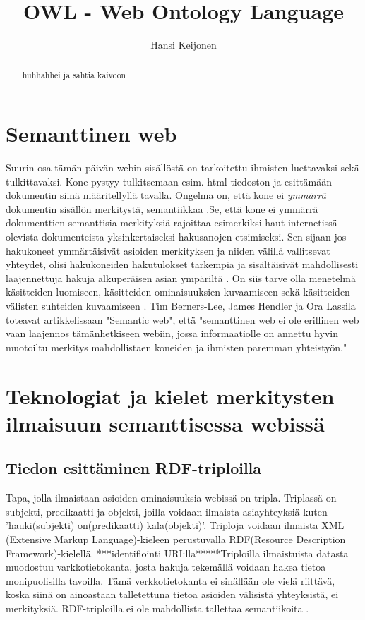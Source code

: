 \documentclass[a4paper,10pt]{article}
\title{OWL - Web Ontology Language}
\author{Hansi Keijonen}
\begin{document}
\maketitle
\newpage

\begin{abstract}
huhhahhei ja sahtia kaivoon
\end{abstract}
\newpage
\section{Semanttinen web}
Suurin osa tämän päivän webin sisällöstä on tarkoitettu ihmisten luettavaksi sekä tulkittavaksi. Kone pystyy tulkitsemaan esim. html-tiedoston ja esittämään dokumentin siinä määritellyllä tavalla. Ongelma on, että kone ei \textit{ymmärrä} dokumentin sisällön merkitystä, semantiikkaa \cite{BHL01}.Se, että kone ei ymmärrä dokumenttien semanttisia merkityksiä rajoittaa esimerkiksi haut internetissä olevista dokumenteista yksinkertaiseksi hakusanojen etsimiseksi. Sen sijaan jos hakukoneet ymmärtäisivät asioiden merkityksen ja niiden välillä vallitsevat yhteydet, olisi hakukoneiden hakutulokset tarkempia ja sisältäisivät mahdollisesti laajennettuja hakuja alkuperäisen asian ympäriltä \cite{BHL01}. On siis tarve olla menetelmä  käsitteiden luomiseen, käsitteiden ominaisuuksien kuvaamiseen sekä käsitteiden välisten suhteiden kuvaamiseen \cite{BHL01}. Tim Berners-Lee, James Hendler ja Ora Lassila toteavat artikkelissaan "Semantic web", että "semanttinen web ei ole erillinen web vaan laajennos tämänhetkiseen webiin, jossa informaatiolle on annettu hyvin muotoiltu merkitys mahdollistaen koneiden ja ihmisten paremman yhteistyön."  
\section{Teknologiat ja kielet merkitysten ilmaisuun semanttisessa webissä}
\subsection{Tiedon esittäminen RDF-triploilla}
Tapa, jolla ilmaistaan asioiden ominaisuuksia webissä on tripla. Triplassä on subjekti, predikaatti ja objekti, joilla voidaan ilmaista asiayhteyksiä kuten 'hauki(subjekti) on(predikaatti) kala(objekti)'. Triploja voidaan ilmaista XML (Extensive Markup Language)-kieleen perustuvalla RDF(Resource Description Framework)-kielellä. ***identifiointi URI:lla*****Triploilla ilmaistuista datasta muodostuu varkkotietokanta, josta hakuja tekemällä voidaan hakea tietoa monipuolisilla tavoilla. Tämä verkkotietokanta ei sinällään ole vielä riittävä, koska siinä on ainoastaan talletettuna tietoa asioiden välisistä yhteyksistä, ei merkityksiä. RDF-triploilla ei ole mahdollista tallettaa semantiikoita \cite{BHL01}. 
\end{document}
